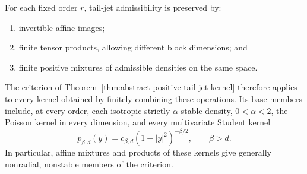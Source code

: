 \begin{proposition}
\label{prop:tail-jet-kernel-closure-and-examples}
For each fixed order \(r\), tail-jet admissibility is preserved by:
\begin{enumerate}[label=\textup{(\roman*)},leftmargin=2.8em]
\item invertible affine images;
\item finite tensor products, allowing different block dimensions; and
\item finite positive mixtures of admissible densities on the same space.
\end{enumerate}
The criterion of Theorem~\ref{thm:abstract-positive-tail-jet-kernel}
therefore applies to every kernel obtained by finitely combining these
operations.  Its base members include, at every order, each isotropic
strictly \(\alpha\)-stable density, \(0<\alpha<2\), the Poisson kernel in
every dimension, and every multivariate Student kernel
\[
 p_{\beta,d}(y)=c_{\beta,d}(1+|y|^2)^{-\beta/2},\qquad \beta>d.
\]
In particular, affine mixtures and products of these kernels give generally
nonradial, nonstable members of the criterion.
\end{proposition}

